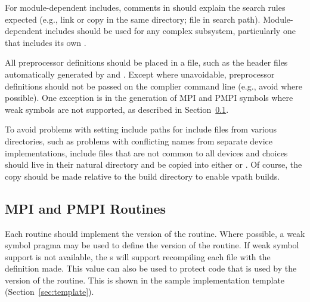 \documentclass{article}
\begin{document}


For module-dependent includes, comments in  should explain the
search rules expected (e.g., link or copy in the same directory; file in
search path).  Module-dependent includes should be used for any complex
subsystem, particularly one that includes its own .

All preprocessor definitions should be placed in a file, such as the
header files automatically generated by
 and .  Except
where unavoidable, preprocessor definitions should not be passed on
the complier command line (e.g., avoid  where
possible). One exception is in the generation of MPI and PMPI symbols
where weak symbols are not supported, as described in
Section~\ref{sec:pmpi-routines}. 

To avoid problems with setting include paths for include files from
various directories, such as problems with conflicting names from
separate device implementations, include files that are not common to
all devices and choices should live in their natural directory and be
copied into either  or .  Of
course, the copy should be made relative to the build directory to
enable vpath builds.

\subsection{MPI and PMPI Routines}
\label{sec:pmpi-routines}
Each routine should implement the  version of the routine.
Where possible, a weak symbol pragma may be used to define the
 version of the routine.  If weak symbol support is not
available, the s will support recompiling each file
with the definition  made.  This value
can also be used to protect code that is used by the 
version of the routine.  This is shown in the sample implementation template
(Section~\ref{sec:template}).
\end{document}
